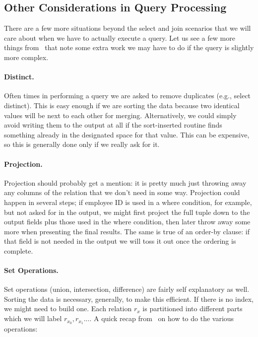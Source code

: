 \documentclass[a4paper]{report}
\begin{document}
\subsection*{Other Considerations in Query Processing}

There are a few more situations beyond the select and join scenarios that we will care about when we have to actually execute a query. Let us see a few more things from~\cite{dsc} that note some extra work we may have to do if the query is slightly more complex.

\paragraph{Distinct.} Often times in performing a query we are asked to remove duplicates (e.g., select distinct). This is easy enough if we are sorting the data because two identical values will be next to each other for merging. Alternatively, we could simply avoid writing them to the output at all if the sort-inserted routine finds something already in the designated space for that value. This can be expensive, so this is generally done only if we really ask for it.

\paragraph{Projection.} Projection should probably get a mention: it is pretty much just throwing away any columns of the relation that we don't need in some way. Projection could happen in several steps; if employee ID is used in a where condition, for example, but not asked for in the output, we might first project the full tuple down to the output fields plus those used in the where condition, then later throw away some more when presenting the final results. The same is true of an order-by clause: if that field is not needed in the output we will toss it out once the ordering is complete.

\paragraph{Set Operations.} Set operations (union, intersection, difference) are fairly self explanatory as well. Sorting the data is necessary, generally, to make this efficient. If there is no index, we might need to build one. Each relation $r_{x}$ is partitioned into different parts which we will label $r_{x_{0}}, r_{x_{1}}...$. A quick recap from~\cite{dsc} on how to do the various operations:
\end{document}
